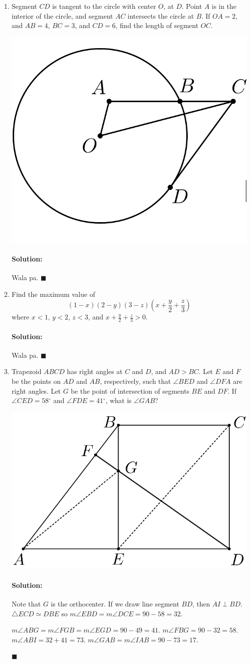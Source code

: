 \documentclass{article}
\newenvironment{solution}{\paragraph{Solution:}}{\hfill$\blacksquare$}
\newcommand{\degre}{\ensuremath{^\circ}}
\begin{document}
\begin{enumerate}
	\item 
	Segment $CD$ is tangent to the circle with center $O$, at $D$. Point $A$ is in the interior of the circle, and segment $AC$ intersects the circle at $B$. If $OA=2$, and $AB=4$, $BC=3$, and $CD=6$, find the length of segment $OC$.
	
	\includegraphics[width=0.25\linewidth]{PMO17_18}
	
	\begin{solution}
		Wala pa.
	\end{solution}
	
	\item Find the maximum value of 
	\begin{equation*}
		(1-x)(2-y)(3-z)\left(x+\dfrac{y}{2}+\dfrac{z}{3}\right)
	\end{equation*}
	where $x<1$, $y<2$, $z<3$, and $x+\frac{y}{2}+\frac{z}{3}>0$.
	
	\begin{solution}
		Wala pa.
	\end{solution}

	\item Trapezoid $ABCD$ has right angles at $C$ and $D$, and $AD > BC$. Let $E$ and $F$ be the points on $AD$ and $AB$, respectively, such that $\angle BED$ and $\angle DFA$ are right angles. Let $G$ be the point of intersection of segments $BE$ and $DF$. If $\angle CED = 58\degre$ and $\angle FDE = 41\degre$, what
	is $\angle GAB$?
	
	\includegraphics[width=0.4\linewidth]{PMO17_20}
	
	
	\begin{solution}
		Note that $G$ is the orthocenter. If we draw line segment $BD$, then $AI\perp BD$. 
		$\triangle ECD\simeq DBE$ so $m\angle EBD = m\angle DCE = 90-58=32$.
		
		$m\angle ABG = m\angle FGB = m\angle EGD = 90 - 49 = 41$. $m\angle FBG = 90-32=58$. $m\angle ABI=32+41=73$. $m\angle GAB = m\angle IAB = 90-73=17$.
		

\end{solution}
\end{enumerate}
\end{document}
